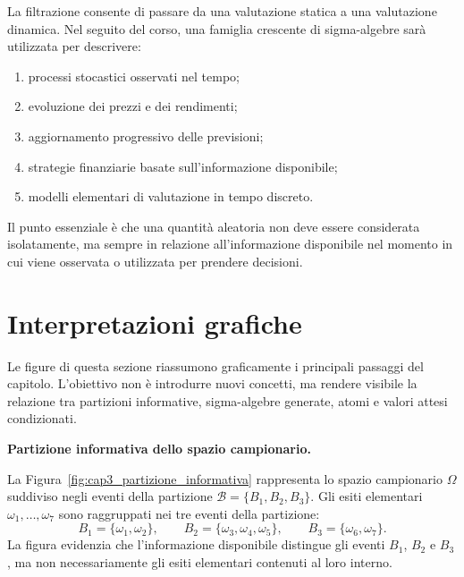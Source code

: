La filtrazione consente di passare da una valutazione statica a una
valutazione dinamica. Nel seguito del corso, una famiglia crescente di
sigma-algebre sar\`{a} utilizzata per descrivere:

\begin{enumerate}
    \item processi stocastici osservati nel tempo;

    \item evoluzione dei prezzi e dei rendimenti;

    \item aggiornamento progressivo delle previsioni;

    \item strategie finanziarie basate sull'informazione disponibile;

    \item modelli elementari di valutazione in tempo discreto.
\end{enumerate}

Il punto essenziale \`{e} che una quantit\`{a} aleatoria non deve essere
considerata isolatamente, ma sempre in relazione all'informazione disponibile
nel momento in cui viene osservata o utilizzata per prendere decisioni.

\newpage

\section{Interpretazioni grafiche}

Le figure di questa sezione riassumono graficamente i principali passaggi del
capitolo. L'obiettivo non \`{e} introdurre nuovi concetti, ma rendere visibile
la relazione tra partizioni informative, sigma-algebre generate, atomi e valori
attesi condizionati.

\medskip

\noindent
\textbf{Partizione informativa dello spazio campionario.}

La Figura~\ref{fig:cap3_partizione_informativa} rappresenta lo spazio
campionario $\Omega$ suddiviso negli eventi della partizione
$\mathcal{B}=\{B_1,B_2,B_3\}$. Gli esiti elementari
$\omega_1,\ldots,\omega_7$ sono raggruppati nei tre eventi della partizione:
\[
B_1=\{\omega_1,\omega_2\},
\qquad
B_2=\{\omega_3,\omega_4,\omega_5\},
\qquad
B_3=\{\omega_6,\omega_7\}.
\]
La figura evidenzia che l'informazione disponibile distingue gli eventi
$B_1$, $B_2$ e $B_3$, ma non necessariamente gli esiti elementari contenuti
al loro interno.

